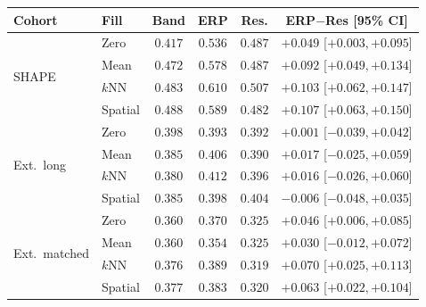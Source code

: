 \begin{tabular}{llcccc}
\toprule
Cohort & Fill & Band & ERP & Res. & ERP$-$Res [95\% CI] \\
\midrule
\multirow{4}{*}{SHAPE} & Zero & $0.417$ & $0.536$ & $0.487$ & $+0.049$ [$+0.003,+0.095$] \\
 & Mean & $0.472$ & $0.578$ & $0.487$ & $+0.092$ [$+0.049,+0.134$] \\
 & $k$NN & $0.483$ & $0.610$ & $0.507$ & $+0.103$ [$+0.062,+0.147$] \\
 & Spatial & $0.488$ & $0.589$ & $0.482$ & $+0.107$ [$+0.063,+0.150$] \\
\midrule
\multirow{4}{*}{Ext.\ long} & Zero & $0.398$ & $0.393$ & $0.392$ & $+0.001$ [$-0.039,+0.042$] \\
 & Mean & $0.385$ & $0.406$ & $0.390$ & $+0.017$ [$-0.025,+0.059$] \\
 & $k$NN & $0.380$ & $0.412$ & $0.396$ & $+0.016$ [$-0.026,+0.060$] \\
 & Spatial & $0.385$ & $0.398$ & $0.404$ & $-0.006$ [$-0.048,+0.035$] \\
\midrule
\multirow{4}{*}{Ext.\ matched} & Zero & $0.360$ & $0.370$ & $0.325$ & $+0.046$ [$+0.006,+0.085$] \\
 & Mean & $0.360$ & $0.354$ & $0.325$ & $+0.030$ [$-0.012,+0.072$] \\
 & $k$NN & $0.376$ & $0.389$ & $0.319$ & $+0.070$ [$+0.025,+0.113$] \\
 & Spatial & $0.377$ & $0.383$ & $0.320$ & $+0.063$ [$+0.022,+0.104$] \\
\bottomrule
\end{tabular}
